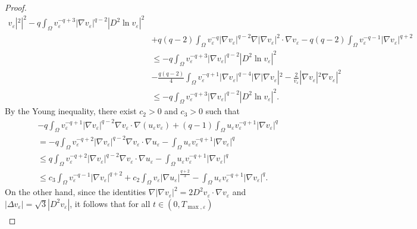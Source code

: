 \documentclass[12pt]{article}
\theoremstyle{plain}
\theoremstyle{definition}
\numberwithin{equation}{section}
\begin{document}
\begin{proof}
\begin{align}
        v_{\varepsilon}|^2|^2-q\int_{\Omega}v_{\varepsilon}^{-q+3}|\nabla v_{\varepsilon}|^{q-2}|D^2 \ln v_{\varepsilon}|^2\nonumber\\
        &+q(q-2)\int_{\Omega}v_{\varepsilon}^{-q}|\nabla v_{\varepsilon}|^{q-2}\nabla |\nabla v_{\varepsilon}|^2\cdot\nabla
        v_{\varepsilon}-q(q-2)\int_{\Omega}v_{\varepsilon}^{-q-1}|\nabla v_{\varepsilon}|^{q+2}\nonumber\\
        &\leq -q\int_{\Omega}v_{\varepsilon}^{-q+3}|\nabla v_{\varepsilon}|^{q-2}|D^2 \ln v_{\varepsilon}|^2\nonumber\\
        &-\frac{q(q-2)}{4}\int_{\Omega}v_{\varepsilon}^{-q+1}|\nabla v_{\varepsilon}|^{q-4}| \nabla |\nabla v_{\varepsilon}|^2 -
        \frac{2}{v_{\varepsilon}}|\nabla v_{\varepsilon}|^2\nabla v_{\varepsilon} |^2\nonumber\\
        &\leq -q\int_{\Omega}v_{\varepsilon}^{-q+3}|\nabla v_{\varepsilon}|^{q-2}|D^2 \ln v_{\varepsilon}|^2.
    \end{align}
   By the Young inequality, there exist $c_2>0$ and $c_3>0$ such that
    \begin{align}\label{2.36}
        &-q\int_{\Omega}v_{\varepsilon}^{-q+1}|\nabla v_{\varepsilon}|^{q-2}\nabla v_{\varepsilon}\cdot\nabla (u_{\varepsilon}
        v_{\varepsilon})+(q-1)\int_{\Omega}u_{\varepsilon}v_{\varepsilon}^{-q+1}|\nabla v_{\varepsilon}|^{q}\nonumber\\
        &=-q\int_{\Omega}v_{\varepsilon}^{-q+2}|\nabla v_{\varepsilon}|^{q-2}\nabla v_{\varepsilon}\cdot\nabla u_{\varepsilon}
        -\int_{\Omega}u_{\varepsilon}v_{\varepsilon}^{-q+1}|\nabla v_{\varepsilon}|^{q}\nonumber\\
        &\leq q\int_{\Omega}v_{\varepsilon}^{-q+2}|\nabla v_{\varepsilon}|^{q-2}\nabla v_{\varepsilon}\cdot\nabla u_{\varepsilon}
        -\int_{\Omega}u_{\varepsilon}v_{\varepsilon}^{-q+1}|\nabla v_{\varepsilon}|^{q}\nonumber\\
        &\leq c_3\int_{\Omega}v_{\varepsilon}^{-q-1}|\nabla v_{\varepsilon}|^{q+2}+c_2\int_{\Omega}v_{\varepsilon}|\nabla
        u_{\varepsilon}|^{\frac{q+2}{3}} -\int_{\Omega}u_{\varepsilon}v_{\varepsilon}^{-q+1}|\nabla v_{\varepsilon}|^{q}.
    \end{align}
    On the other hand, since the identities $\nabla |\nabla
     v_{\varepsilon}|^2=2D^2v_{\varepsilon}\cdot\nabla v_{\varepsilon}$ and $|\Delta v_{\varepsilon}|=\sqrt{3}|D^2v_{\varepsilon}|$, it follows that
     for all $t \in(0, T_{\max, \varepsilon})$
     \begin{align}\label{2.37}

\end{align}
\end{proof}
\end{document}
